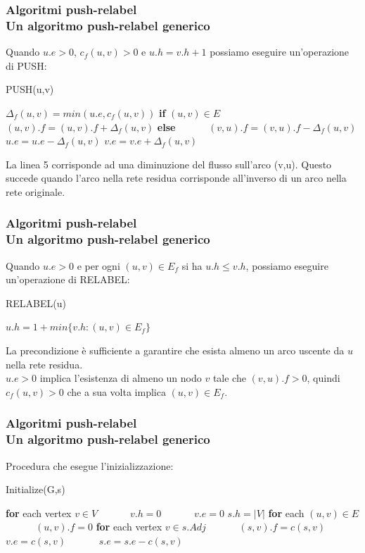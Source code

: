 \documentclass{beamer}
\begin{document}
\begin{frame}
\frametitle{Algoritmi push-relabel\\Un algoritmo push-relabel generico}
Quando $u.e>0$, $c_f(u,v)>0$ e $u.h=v.h+1$ possiamo eseguire un'operazione di PUSH:
\begin{algorithm}[H]
    \caption{PUSH(u,v)}%
    \begin{algorithmic}[1]
        \State $\Delta_f(u,v)=min(u.e,c_f(u,v))$
        \State \textbf{if} $(u,v)\in E$
        \State \ \ \ \ \ \ $(u,v).f = (u,v).f+\Delta_f(u,v)$
        \State \textbf{else}
        \State \ \ \ \ \ \ $(v,u).f = (v,u).f-\Delta_f(u,v)$
        \State $u.e=u.e-\Delta_f(u,v)$
        \State $v.e=v.e+\Delta_f(u,v)$
    \end{algorithmic}
    \label{alg_1}
\end{algorithm}
La linea 5 corrisponde ad una diminuzione del flusso sull'arco (v,u). Questo succede quando l'arco nella rete residua corrisponde all'inverso di un arco nella rete originale.
\end{frame}

\begin{frame}
\frametitle{Algoritmi push-relabel\\Un algoritmo push-relabel generico}
Quando $u.e>0$ e per ogni $(u,v)\in E_f$ si ha $u.h\leq v.h$, possiamo eseguire un'operazione di RELABEL:
\begin{algorithm}[H]
    \caption{RELABEL(u)}%
    \begin{algorithmic}[1]
        \State $u.h=1+min\{v.h:(u,v)\in E_f\}$
    \end{algorithmic}
    \label{alg_1}
\end{algorithm}
La precondizione è sufficiente a garantire che esista almeno un arco uscente da $u$ nella rete residua.\\
$u.e>0$ implica l'esistenza di almeno un nodo $v$ tale che $(v,u).f>0$,  quindi $c_f(u,v)>0$ che a sua volta implica $(u,v)\in E_f$.
\end{frame}

\begin{frame}
\frametitle{Algoritmi push-relabel\\Un algoritmo push-relabel generico}
Procedura che esegue l'inizializzazione:
\begin{algorithm}[H]
    \caption{Initialize(G,s)}%
    \begin{algorithmic}[1]
        \State \textbf{for} each vertex $v\in V$
        \State \ \ \ \ \ \ $v.h=0$
        \State \ \ \ \ \ \ $v.e=0$
        \State $s.h=|V|$
        \State \textbf{for} each $(u,v)\in E$
        \State \ \ \ \ \ \ $(u,v).f=0$
        \State \textbf{for} each vertex $v\in s.Adj$
        \State \ \ \ \ \ \ $(s,v).f=c(s,v)$
        \State \ \ \ \ \ \ $v.e=c(s,v)$
        \State \ \ \ \ \ \ $s.e=s.e-c(s,v)$
    \end{algorithmic}
    \label{alg_1}
\end{algorithm}
\end{frame}
\end{document}

